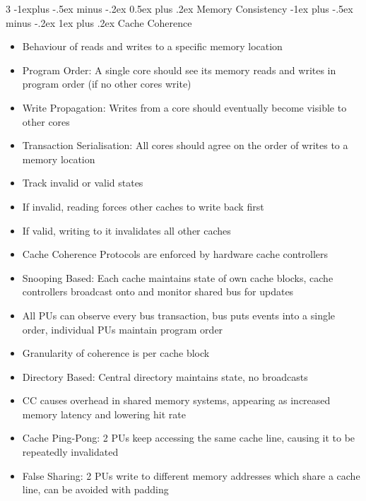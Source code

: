 \documentclass[10pt, landscape]{article}
\makeatletter
\renewcommand{\section}{\@startsection{section}{1}{0mm}%
                                {-1ex plus -.5ex minus -.2ex}%
                                {0.5ex plus .2ex}%
                                {\normalfont\large\bfseries}}
\renewcommand{\section}{\@startsection{section}{2}{0mm}%
                                {-1explus -.5ex minus -.2ex}%
                                {0.5ex plus .2ex}%
                                {\normalfont\normalsize\bfseries}}
\renewcommand{\subsection}{\@startsection{subsection}{3}{0mm}%
                                {-1ex plus -.5ex minus -.2ex}%
                                {1ex plus .2ex}%
                                {\normalfont\small\bfseries}}%
\makeatother
\begin{document}
\begin{multicols*}{3}
\section{Memory Consistency}
\subsection{Cache Coherence}
\begin{itemize}
    \item Behaviour of reads and writes to a specific memory location
    \item Program Order: A single core should see its memory reads and writes in program order (if no other cores write)
    \item Write Propagation: Writes from a core should eventually become visible to other cores
    \item Transaction Serialisation: All cores should agree on the order of writes to a memory location
    \item Track invalid or valid states
    \item If invalid, reading forces other caches to write back first
    \item If valid, writing to it invalidates all other caches
    \item Cache Coherence Protocols are enforced by hardware cache controllers
    \item Snooping Based: Each cache maintains state of own cache blocks, cache controllers broadcast onto and monitor shared bus for updates
    \item All PUs can observe every bus transaction, bus puts events into a single order, individual PUs maintain program order
    \item Granularity of coherence is per cache block
    \item Directory Based: Central directory maintains state, no broadcasts
    \item CC causes overhead in shared memory systems, appearing as increased memory latency and lowering hit rate
    \item Cache Ping-Pong: 2 PUs keep accessing the same cache line, causing it to be repeatedly invalidated
    \item False Sharing: 2 PUs write to different memory addresses which share a cache line, can be avoided with padding
\end{itemize}


\end{multicols*}
\end{document}
